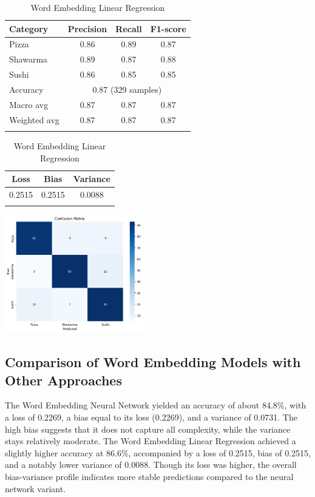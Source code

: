 \begin{table}[h]
    \centering
    \begin{tabular}{lccc}
        \hline
        Category     & Precision                              & Recall & F1-score \\
        \hline
        Pizza        & 0.86                                   & 0.89   & 0.87     \\
        Shawarma     & 0.89                                   & 0.87   & 0.88     \\
        Sushi        & 0.86                                   & 0.85   & 0.85     \\
        \hline
        Accuracy     & \multicolumn{3}{c}{0.87 (329 samples)}                     \\
        Macro avg    & 0.87                                   & 0.87   & 0.87     \\
        Weighted avg & 0.87                                   & 0.87   & 0.87     \\
        \hline                                                                    \\
    \end{tabular}
    \begin{tabular}{ccc}
        \hline
        Loss   & Bias   & Variance \\
        \hline
        0.2515 & 0.2515 & 0.0088   \\
        \hline                     \\
    \end{tabular}
    \includegraphics[width=0.45\textwidth]{model/linearregression_confusion.png}
    \caption{Word Embedding Linear Regression}
\end{table}

\subsection{Comparison of Word Embedding Models with Other Approaches}
The Word Embedding Neural Network yielded an accuracy of about 84.8\%, with a loss of 0.2269, a bias equal to its loss (0.2269), and a variance of 0.0731. The high bias suggests that it does not capture all complexity, while the variance stays relatively moderate. The Word Embedding Linear Regression achieved a slightly higher accuracy at 86.6\%, accompanied by a loss of 0.2515, bias of 0.2515, and a notably lower variance of 0.0088. Though its loss was higher, the overall bias-variance profile indicates more stable predictions compared to the neural network variant.

